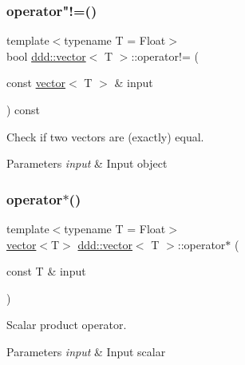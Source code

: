 \subsubsection{\texorpdfstring{operator"!=()}{operator!=()}}
{\footnotesize\ttfamily template$<$typename T = Float$>$ \\
bool \hyperlink{classddd_1_1vector}{ddd\+::vector}$<$ T $>$\+::operator!= (\begin{DoxyParamCaption}\item[{const \hyperlink{classddd_1_1vector}{vector}$<$ T $>$ \&}]{input }\end{DoxyParamCaption}) const\hspace{0.3cm}{\ttfamily [inline]}}



Check if two vectors are (exactly) equal. 


\begin{DoxyParams}{Parameters}
{\em input} & Input object \\
\hline
\end{DoxyParams}
\mbox{\label{classddd_1_1vector_a9ba05f9c13f8d9cd23f5a5657fcfa948}} 
\subsubsection{\texorpdfstring{operator$\ast$()}{operator*()}}
{\footnotesize\ttfamily template$<$typename T = Float$>$ \\
\hyperlink{classddd_1_1vector}{vector}$<$T$>$ \hyperlink{classddd_1_1vector}{ddd\+::vector}$<$ T $>$\+::operator$\ast$ (\begin{DoxyParamCaption}\item[{const T \&}]{input }\end{DoxyParamCaption})\hspace{0.3cm}{\ttfamily [inline]}}



Scalar product operator. 


\begin{DoxyParams}{Parameters}
{\em input} & Input scalar \\
\hline
\end{DoxyParams}
\mbox{\label{classddd_1_1vector_a03e9624cbd1f3fa29247c1a67a8678d9}} 
